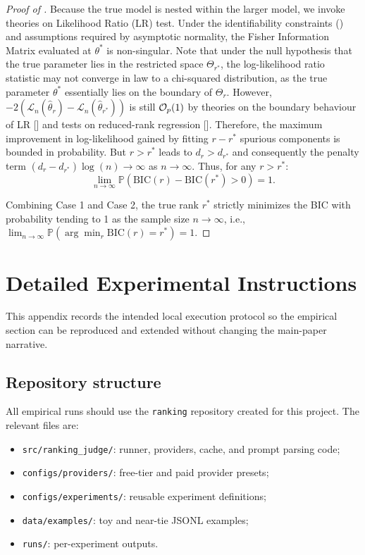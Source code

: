 \documentclass{article}
\begin{document}
\begin{bibunit}[unsrtnat]
\begin{proof}[Proof of ]
Because the true model is nested within the larger model, we invoke theories on Likelihood Ratio (LR) test. Under the identifiability constraints () and assumptions required by asymptotic normality, the Fisher Information Matrix evaluated at $\theta^*$ is non-singular. 
Note that under the null hypothesis that the true parameter lies in the restricted space $\Theta_{r^*}$, the log-likelihood ratio statistic may not converge in law to a chi-squared distribution, as the true parameter $\theta^*$ essentially lies on the boundary of $\Theta_r$. However,  $-2\left(\mathcal{L}_n(\hat{\theta}_r) - \mathcal{L}_n(\hat{\theta}_{r^*})\right)$ is still $\mathcal{O}_p(1)$ by theories on the boundary behaviour of LR [\citealp[Theorem 3]{liang1987asymptotic}] and tests on reduced-rank regression [\citealp[Theorem 3.2]{Robin_Smith_2000}].
Therefore, the maximum improvement in log-likelihood gained by fitting $r - r^*$ spurious components is bounded in probability. But $r > r^*$ leads to $d_r > d_{r^*}$ and consequently the penalty term $(d_r - d_{r^*})\log(n) \to \infty$ as $n \to \infty$. 
Thus, for any $r > r^*$:
\begin{equation*}
    \lim_{n \to \infty} \mathbb{P}\left( \text{BIC}(r) - \text{BIC}(r^*) > 0 \right) = 1.
\end{equation*}

Combining Case 1 and Case 2, the true rank $r^*$ strictly minimizes the BIC with probability tending to 1 as the sample size $n \to \infty$, i.e., $\lim_{n \to \infty} \mathbb{P}\left(\arg\min_r \text{BIC}(r)=r^*\right) = 1$.
\end{proof}

\clearpage
\section{Detailed Experimental Instructions}
\label{app:instructions}

This appendix records the intended local execution protocol so the empirical section can be reproduced and extended without changing the main-paper narrative.

\subsection{Repository structure}

All empirical runs should use the \texttt{ranking} repository created for this project. The relevant files are:
\begin{itemize}[leftmargin=1.5em]
  \item \texttt{src/ranking\_judge/}: runner, providers, cache, and prompt parsing code;
  \item \texttt{configs/providers/}: free-tier and paid provider presets;
  \item \texttt{configs/experiments/}: reusable experiment definitions;
  \item \texttt{data/examples/}: toy and near-tie JSONL examples;
  \item \texttt{runs/}: per-experiment outputs.
\end{itemize}


\end{bibunit}
\end{document}
